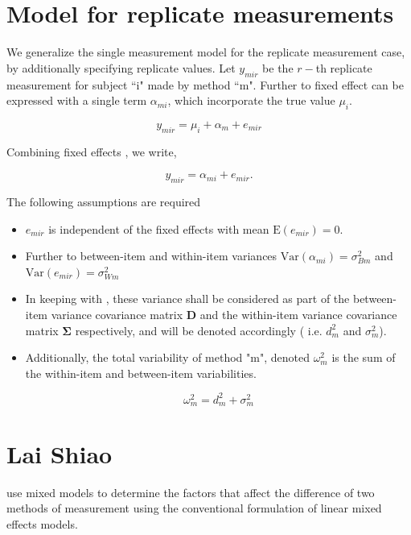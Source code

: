 \documentclass[12pt, a4paper]{report}
\theoremstyle{plain}
\theoremstyle{definition}
\theoremstyle{remark}
\begin{document}
	\section{Model for replicate measurements}
	
	We generalize the single measurement model for the replicate measurement case, by additionally specifying replicate values. Let $y_{mir}$ be the $r-$th replicate measurement for subject ``i" made by method ``m". Further to \citet{barnhart} fixed effect can be expressed with a single term $\alpha_{mi}$, which incorporate the true value $\mu_i$.
	
	\[ y_{mir} = \mu_{i} + \alpha_{m} + e_{mir}  \]
	
	Combining fixed effects \citep{barnhart}, we write,
	
	\[ y_{mir} = \alpha_{mi} + e_{mir}.\]
	
	The following assumptions are required
	
	\begin{itemize}
		\item $e_{mir}$ is independent of the fixed effects with mean $\mbox{E}(e_{mir}) = 0$.
		\item Further to \citet{barnhart} between-item and within-item variances $\mbox{Var}(\alpha_{mi}) = \sigma^2_{Bm}$ and $\mbox{Var}(e_{mir}) = \sigma^2_{Wm}$
		\item In keeping with \citet{ARoy2009}, these variance shall be considered as part of the between-item variance covariance matrix $\boldsymbol{D}$ and the within-item variance covariance matrix  $\boldsymbol{\Sigma}$
		respectively, and will be denoted accordingly ( i.e. $d^2_{m}$ and $\sigma^2_{m}$).
		\item Additionally, the total variability of method "m", denoted $\omega^2_m$ is the sum of the within-item and between-item variabilities.
		
		\[ \omega^2_m = d^2_{m}+ \sigma^2_{m} \]
		
	\end{itemize}
	\newpage
	
	
\section{Lai Shiao}
\citet{LaiShiao} use mixed models to determine the factors that
affect the difference of two methods of measurement using the
conventional formulation of linear mixed effects models.
\end{document}
